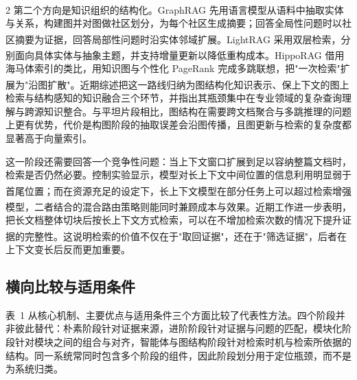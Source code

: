 \documentclass[10.5pt,compsoc,UTF8]{CjC}
\theoremstyle{mystyle}
\newcommand{\upcite}[1]{\textsuperscript{\cite{#1}}}
\begin{document}
\begin{multicols}{2}
第二个方向是知识组织的结构化。GraphRAG\upcite{edge2024from} 先用语言模型从语料中抽取实体与关系，构建图并对图做社区划分，为每个社区生成摘要；回答全局性问题时以社区摘要为证据，回答局部性问题时沿实体邻域扩展。LightRAG \upcite{guo2024lightrag}采用双层检索，分别面向具体实体与抽象主题，并支持增量更新以降低重构成本。HippoRAG\upcite{gutirrez2024hipporag} 借用海马体索引的类比，用知识图与个性化 PageRank 完成多跳联想，把"一次检索"扩展为"沿图扩散"。近期综述\upcite{zhang2025graphrag}把这一路线归纳为图结构化知识表示、保上下文的图上检索与结构感知的知识融合三个环节，并指出其瓶颈集中在专业领域的复杂查询理解与跨源知识整合。与平坦片段相比，图结构在需要跨文档聚合与多跳推理的问题上更有优势，代价是构图阶段的抽取误差会沿图传播，且图更新与检索的复杂度都显著高于向量索引。

这一阶段还需要回答一个竞争性问题：当上下文窗口扩展到足以容纳整篇文档时，检索是否仍然必要。控制实验显示，模型对长上下文中间位置的信息利用明显弱于首尾位置\upcite{liu2024lost}；而在资源充足的设定下，长上下文模型在部分任务上可以超过检索增强模型，二者结合的混合路由策略则能同时兼顾成本与效果\upcite{li2024retrieval}。近期工作进一步表明，把长文档整体切块后按长上下文方式检索，可以在不增加检索次数的情况下提升证据的完整性\upcite{jiang2024longrag}。这说明检索的价值不仅在于"取回证据"，还在于"筛选证据"，后者在上下文变长后反而更加重要。

\subsection{\heiti 横向比较与适用条件}

表~1 从核心机制、主要优点与适用条件三个方面比较了代表性方法。四个阶段并非彼此替代：朴素阶段针对证据来源，进阶阶段针对证据与问题的匹配，模块化阶段针对模块之间的组合与对齐，智能体与图结构阶段针对检索时机与检索所依据的结构。同一系统常同时包含多个阶段的组件，因此阶段划分用于定位瓶颈，而不是为系统归类。

\end{multicols}
\end{document}
